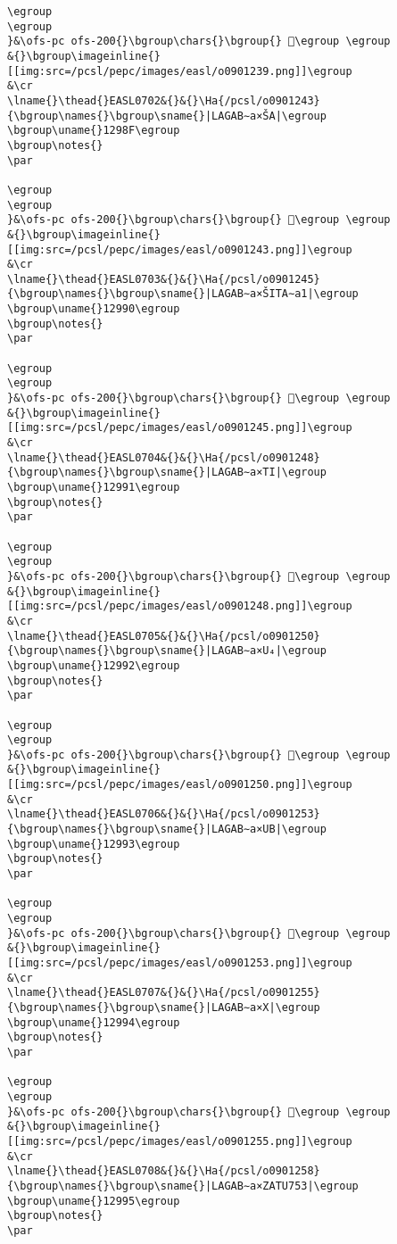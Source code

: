 \begin{verbatim}
\egroup
\egroup
}&\ofs-pc ofs-200{}\bgroup\chars{}\bgroup{} 𒦎\egroup \egroup
&{}\bgroup\imageinline{}[[img:src=/pcsl/pepc/images/easl/o0901239.png]]\egroup
&\cr
\lname{}\thead{}EASL0702&{}&{}\Ha{/pcsl/o0901243}{\bgroup\names{}\bgroup\sname{}|LAGAB∼a×ŠA|\egroup
\bgroup\uname{}1298F\egroup
\bgroup\notes{}
\par 

\egroup
\egroup
}&\ofs-pc ofs-200{}\bgroup\chars{}\bgroup{} 𒦏\egroup \egroup
&{}\bgroup\imageinline{}[[img:src=/pcsl/pepc/images/easl/o0901243.png]]\egroup
&\cr
\lname{}\thead{}EASL0703&{}&{}\Ha{/pcsl/o0901245}{\bgroup\names{}\bgroup\sname{}|LAGAB∼a×ŠITA∼a1|\egroup
\bgroup\uname{}12990\egroup
\bgroup\notes{}
\par 

\egroup
\egroup
}&\ofs-pc ofs-200{}\bgroup\chars{}\bgroup{} 𒦐\egroup \egroup
&{}\bgroup\imageinline{}[[img:src=/pcsl/pepc/images/easl/o0901245.png]]\egroup
&\cr
\lname{}\thead{}EASL0704&{}&{}\Ha{/pcsl/o0901248}{\bgroup\names{}\bgroup\sname{}|LAGAB∼a×TI|\egroup
\bgroup\uname{}12991\egroup
\bgroup\notes{}
\par 

\egroup
\egroup
}&\ofs-pc ofs-200{}\bgroup\chars{}\bgroup{} 𒦑\egroup \egroup
&{}\bgroup\imageinline{}[[img:src=/pcsl/pepc/images/easl/o0901248.png]]\egroup
&\cr
\lname{}\thead{}EASL0705&{}&{}\Ha{/pcsl/o0901250}{\bgroup\names{}\bgroup\sname{}|LAGAB∼a×U₄|\egroup
\bgroup\uname{}12992\egroup
\bgroup\notes{}
\par 

\egroup
\egroup
}&\ofs-pc ofs-200{}\bgroup\chars{}\bgroup{} 𒦒\egroup \egroup
&{}\bgroup\imageinline{}[[img:src=/pcsl/pepc/images/easl/o0901250.png]]\egroup
&\cr
\lname{}\thead{}EASL0706&{}&{}\Ha{/pcsl/o0901253}{\bgroup\names{}\bgroup\sname{}|LAGAB∼a×UB|\egroup
\bgroup\uname{}12993\egroup
\bgroup\notes{}
\par 

\egroup
\egroup
}&\ofs-pc ofs-200{}\bgroup\chars{}\bgroup{} 𒦓\egroup \egroup
&{}\bgroup\imageinline{}[[img:src=/pcsl/pepc/images/easl/o0901253.png]]\egroup
&\cr
\lname{}\thead{}EASL0707&{}&{}\Ha{/pcsl/o0901255}{\bgroup\names{}\bgroup\sname{}|LAGAB∼a×X|\egroup
\bgroup\uname{}12994\egroup
\bgroup\notes{}
\par 

\egroup
\egroup
}&\ofs-pc ofs-200{}\bgroup\chars{}\bgroup{} 𒦔\egroup \egroup
&{}\bgroup\imageinline{}[[img:src=/pcsl/pepc/images/easl/o0901255.png]]\egroup
&\cr
\lname{}\thead{}EASL0708&{}&{}\Ha{/pcsl/o0901258}{\bgroup\names{}\bgroup\sname{}|LAGAB∼a×ZATU753|\egroup
\bgroup\uname{}12995\egroup
\bgroup\notes{}
\par 


\end{verbatim}
